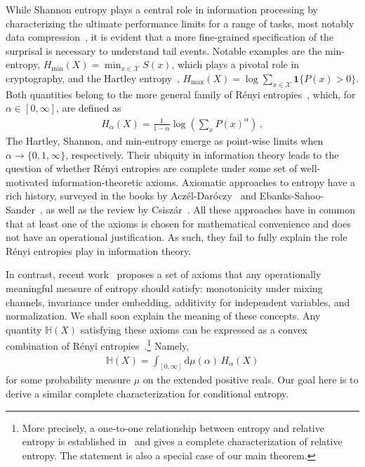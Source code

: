 \documentclass[aps,pra,11pt,onecolumn,nofootinbib,tightenlines]{revtex4-2}
\theoremstyle{definition}
\def \d {\mathrm{d}}
\renewcommand{\H}{\mathbb{H}}
\newcommand{\mc}[1]{\mathcal{#1}}
\begin{document}
While Shannon entropy plays a central role in information processing by characterizing the ultimate performance limits for a range of tasks, most notably data compression~\cite{shannon1948mathematical}, it is evident that a more fine-grained specification of the surprisal is necessary to understand tail events. Notable examples are the min-entropy, $H_{\min}(X) = \min_{x \in \mc{X}} S(x)$, which plays a pivotal role in cryptography, and the Hartley entropy~\cite{hartley28}, $H_{\max}(X) = \log \sum_{x \in \mc{X}} \mathbf{1}\{ P(x) > 0\}$. Both quantities belong to the more general family of R\'enyi entropies~\cite{renyi61}, which, for $\alpha\in[0,\infty]$, are defined as
\begin{align}
    H_{\alpha}(X)  = \frac{1}{1-\alpha} \log \left( \sum_{x} P(x)^{\alpha} \right) \,,
\end{align}
The Hartley, Shannon, and min-entropy emerge as point-wise limits when $\alpha \to \{0, 1, \infty\}$, respectively. Their ubiquity in information theory leads to the question of whether Rényi entropies are complete under some set of well-motivated information-theoretic axioms. Axiomatic approaches to entropy have a rich history, surveyed in the books by Acz\'el-Dar\'oczy~\cite{aczel75} and Ebanks-Sahoo-Sander~\cite{ebanks98}, as well as the review by Csisz\'ar~\cite{csiszar08}. All these approaches have in common that at least one of the axioms is chosen for mathematical convenience and does not have an operational justification. As such, they fail to fully explain the role Rényi entropies play in information theory.

In contrast, recent work~\cite{gour21_axiomatic} proposes a set of axioms that
any operationally meaningful measure of entropy should satisfy: monotonicity under mixing channels, invariance under embedding, additivity for independent variables, and normalization. We shall soon explain the meaning of these concepts.
%
%
Any quantity $\H(X)$ satisfying these axioms can be expressed as a convex combination of Rényi entropies~\cite{mu21_renyi,gour21_axiomatic}.\footnote{More precisely, a one-to-one relationship between entropy and relative entropy is established in~\cite{gour21_axiomatic} and \cite{mu21_renyi} gives a complete characterization of relative entropy. The statement is also a special case of our main theorem.} Namely,
\begin{align}\label{eq:EntropyBarycentre}
    \H(X) = \int_{[0,\infty]} \d\mu(\alpha) \, H_{\alpha}(X)
\end{align}
for some probability measure $\mu$ on the extended positive reals. Our goal here is to derive a similar complete characterization for conditional entropy.
\end{document}
